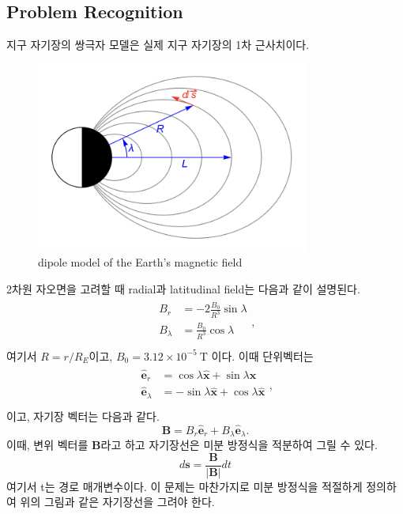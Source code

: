 \documentclass[11pt]{article}
\begin{document}
\subsection{Problem Recognition} 
지구 자기장의 쌍극자 모델은 실제 지구 자기장의 1차 근사치이다. 
\begin{figure}[!ht]
  \centering
  \includegraphics[width=0.8\textwidth]{ElectricField.png}
  \caption{dipole model of the Earth’s magnetic field}
\end{figure} 
2차원 자오면을 고려할 때 radial과 latitudinal field는 다음과 같이 설명된다.
\begin{equation}
\begin{split}
\begin{aligned}
B_r &= -2 \frac{B_0}{R^3} \sin\lambda \\
B_\lambda &= \frac{B_0}{R^3} \cos\lambda \\
\end{aligned}
,
\end{split}
\end{equation}
여기서 $R = r / R_E$이고, $B_0 = 3.12 \times 10^{-5}\ \mathrm{T}$ 이다. 이때 단위벡터는 
\begin{equation}
\begin{split}
\begin{aligned}
\hat{\mathbf e}_r &= \cos\lambda \hat{\mathbf x} + \sin\lambda \hat{\mathbf x} \\
\hat{\mathbf e}_\lambda &= -\sin\lambda \hat{\mathbf x} + \cos\lambda \hat{\mathbf x} \\
\end{aligned}
,
\end{split}
\end{equation}
이고, 자기장 벡터는 다음과 같다.
\begin{equation}
\mathbf B = B_r \hat{\mathbf e}_r + B_\lambda \hat{\mathbf e}_\lambda
.
\end{equation}
이때, 변위 벡터를 $\mathbf B$라고 하고 자기장선은 미분 방정식을 적분하여 그릴 수 있다.
\begin{equation}
d\mathbf s = \frac{\mathbf B}{|\mathbf B|} dt
\end{equation}
여기서 t는 경로 매개변수이다. 이 문제는 마찬가지로 미분 방정식을 적절하게 정의하여 위의 그림과 같은 자기장선을 그려야 한다.
\end{document}
